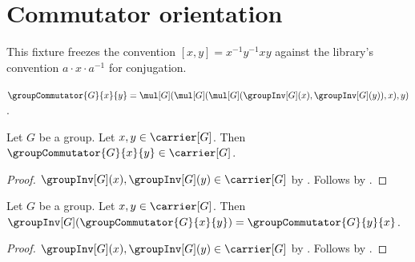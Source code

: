 

\section{Commutator orientation}

This fixture freezes the convention
\( [x,y]=x^{-1}y^{-1}xy \) against the library's convention
\(a\mathbin{\cdot}x\mathbin{\cdot}a^{-1}\) for conjugation.

\begin{definition}\label{spike17_group_commutator}
    $\groupCommutator{G}{x}{y}=
        \mul[G](
            \mul[G](
                \mul[G](\groupInv[G](x),\groupInv[G](y)),x),y)$.
\end{definition}

\begin{proposition}\label{spike17_group_commutator_type}
    Let $G$ be a group.
    Let $x,y\in\carrier[G]$.
    Then $\groupCommutator{G}{x}{y}\in\carrier[G]$.
\end{proposition}
\begin{proof}
    $\groupInv[G](x),\groupInv[G](y)\in\carrier[G]$ by
        .
    Follows by
        .
\end{proof}

\begin{theorem}\label{spike17_group_commutator_inverse}
    Let $G$ be a group.
    Let $x,y\in\carrier[G]$.
    Then
        $\groupInv[G](\groupCommutator{G}{x}{y})
            =\groupCommutator{G}{y}{x}$.
\end{theorem}
\begin{proof}
    $\groupInv[G](x),\groupInv[G](y)\in\carrier[G]$ by
        .
    Follows by
        .
\end{proof}


